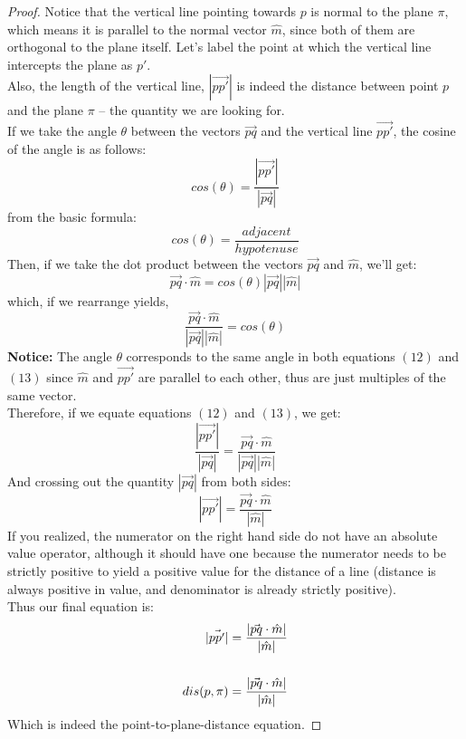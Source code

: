 \documentclass[hidelinks, a4paper, 12pt]{article}
\newcommand{\bd}{\textbf}
\newcommand{\mhat}{\hat{m}}
\newcommand{\n}{\\[\baselineskip]}
\begin{document}
            \begin{proof}
                Notice that the vertical line pointing towards $p$ is normal to the plane $\pi$, which means it is parallel to the normal vector $\mhat$, since both
                of them are orthogonal to the plane itself.
                Let's label the point at which the vertical line intercepts the plane as $p'$.\n
                Also, the length of the vertical line, $|\vec{pp'}|$ is indeed the distance between point $p$ and the plane $\pi$ -- the quantity
                we are looking for.\n
                If we take the angle $\theta$ between the vectors $\vec{pq}$ and the vertical line $\vec{pp'}$, the cosine of the angle is as follows:
                \begin{equation}
                    cos(\theta) = \frac{|\vec{pp'}|}{|\vec{pq}|}
                \end{equation}
                from the basic formula:
                \[cos(\theta) = \frac{adjacent}{hypotenuse}\]
                Then, if we take the dot product between the vectors $\vec{pq}$ and $\mhat$, we'll get:
                \[\vec{pq}\cdot\mhat = cos(\theta)|\vec{pq}||\mhat|\]
                which, if we rearrange yields,
                \begin{equation}
                    \frac{\vec{pq}\cdot\mhat}{|\vec{pq}||\mhat|} = cos(\theta)
                \end{equation}
                \bd{Notice: }The angle $\theta$ corresponds to the same angle in both equations $(12)$ and $(13)$ since $\mhat$ and $\vec{pp'}$ are parallel to each other, 
                thus are just multiples of the same vector.\n
                Therefore, if we equate equations $(12)$ and $(13)$, we get:
                \[\frac{|\vec{pp'}|}{|\vec{pq}|} = \frac{\vec{pq}\cdot\mhat}{|\vec{pq}||\mhat|}\]
                And crossing out the quantity $|\vec{pq}|$ from both sides:
                \[|\vec{pp'}| = \frac{\vec{pq}\cdot\mhat}{|\mhat|}\]
                If you realized, the numerator on the right hand side do not have an absolute value operator, although it should have one because the numerator
                needs to be strictly positive to yield a positive value for the distance of a line (distance is always positive in value, and denominator is already strictly positive).\n
                Thus our final equation is:
                \[\begin{split}
                    |\vec{pp'}| &= \frac{|\vec{pq}\cdot\mhat|}{|\mhat|}\n
                    dis(p, \pi) &= \frac{|\vec{pq}\cdot\mhat|}{|\mhat|}\qedhere
                \end{split}\]
                Which is indeed the point-to-plane-distance equation.
            \end{proof}
\end{document}
